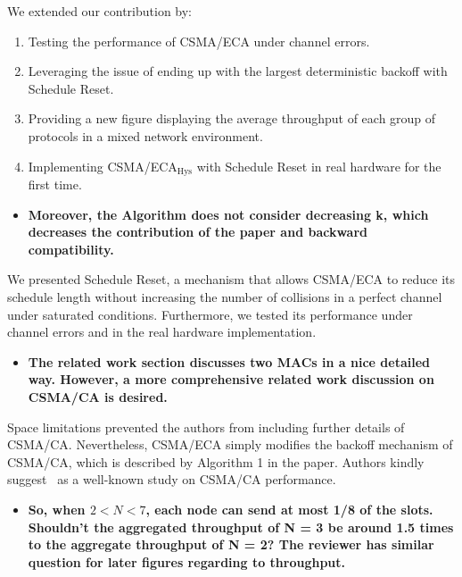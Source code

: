 \documentclass[]{article}
\begin{document}
		We extended our contribution by:
			\begin{enumerate}
				\item Testing the performance of CSMA/ECA under channel errors.
				\item Leveraging the issue of ending up with the largest deterministic backoff with Schedule Reset.
				\item Providing a new figure displaying the average throughput of each group of protocols in a mixed network environment.
				\item Implementing CSMA/ECA$_{\text{Hys}}$ with Schedule Reset in real hardware for the first time.
			\end{enumerate}
			
		\begin{itemize}
			\item {\bfseries Moreover, the Algorithm does not consider decreasing k, which decreases the contribution of the paper and backward compatibility.}
		\end{itemize}
		
		We presented Schedule Reset, a mechanism that allows CSMA/ECA to reduce its schedule length without increasing the number of collisions in a perfect channel under saturated conditions. Furthermore, we tested its performance under channel errors and in the real hardware implementation.
		
		\begin{itemize}
			\item {\bfseries The related work section discusses two MACs in a nice detailed way. However, a more comprehensive related work discussion on CSMA/CA is desired.}
		\end{itemize}
		
		Space limitations prevented the authors from including further details of CSMA/CA. Nevertheless, CSMA/ECA simply modifies the backoff mechanism of CSMA/CA, which is described by Algorithm 1 in the paper. Authors kindly suggest~\cite{bianchi2000performance} as a well-known study on CSMA/CA performance.
		
		\begin{itemize}
			\item {\bfseries So, when $2 < N < 7$, each node can send at most 1/8 of the slots. Shouldn't the aggregated throughput of N = 3 be around 1.5 times to the aggregate throughput of N = 2? The reviewer has similar question for later figures regarding to throughput.}
		\end{itemize}
		
\end{document}
